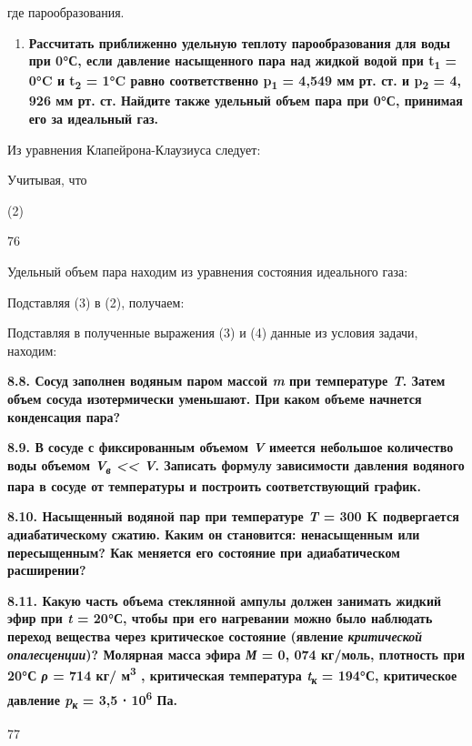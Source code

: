 
где %
парообразования.

\begin{enumerate}
\def\labelenumi{\arabic{enumi}.}
\setcounter{enumi}{6}
\item
  \textbf{Рассчитать приближенно удельную теплоту парообразования для
  воды при 0°С, если давление насыщенного пара над жидкой водой при
  t\textsubscript{1} = 0°C и t\textsubscript{2} = 1°C равно
  соответственно p\textsubscript{1} = 4,549 мм рт. ст. и
  p\textsubscript{2} = 4, 926 мм рт. ст. Найдите также удельный объем
  пара при 0°С, принимая его за идеальный газ.}
\end{enumerate}

\solving{}

Из уравнения Клапейрона-Клаузиуса следует:


Учитывая, что %

(2)

76

Удельный объем пара находим из уравнения состояния идеального газа:


Подставляя (3) в (2), получаем:


Подставляя в полученные выражения (3) и (4) данные из условия задачи,
находим:


\textbf{8.8. Сосуд заполнен водяным паром массой \emph{m} при
температуре \emph{T}. Затем объем сосуда изотермически уменьшают. При
каком объеме начнется конденсация пара?}

\textbf{8.9. В сосуде с фиксированным объемом \emph{V} имеется небольшое
количество воды объемом \emph{V\textsubscript{в} \textless\textless{}
V}. Записать формулу зависимости давления водяного пара в сосуде от
температуры и построить соответствующий график.}

\textbf{8.10. Насыщенный водяной пар при температуре \emph{T} = 300 K
подвергается адиабатическому сжатию. Каким он становится: ненасыщенным
или пересыщенным? Как меняется его состояние при адиабатическом
расширении?}

\textbf{8.11. Какую часть объема стеклянной ампулы должен занимать
жидкий эфир при \emph{t} = 20°С, чтобы при его нагревании можно было
наблюдать переход вещества через критическое состояние (явление
\emph{критической опалесценции})? Молярная масса эфира \emph{М} = 0, 074
кг/моль, плотность при 20°С \emph{ρ} = 714 кг/ м\textsuperscript{3} ,
критическая температура \emph{t\textsubscript{к}} = 194°С, критическое
давление \emph{p\textsubscript{к}} = 3,5 ⋅ 10\textsuperscript{6} Па.}

77